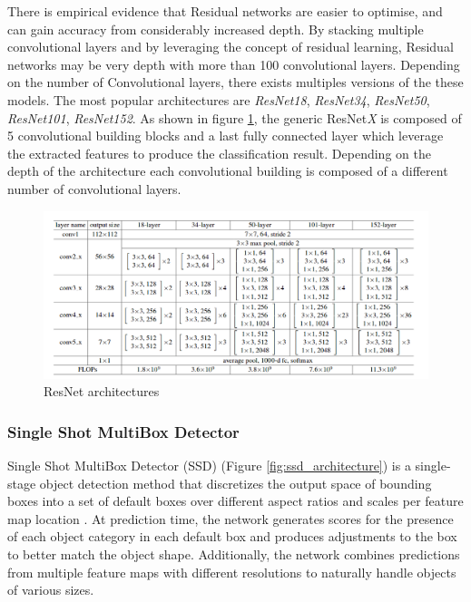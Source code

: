There is empirical evidence that Residual networks are easier to optimise, and can gain accuracy from considerably increased depth. By stacking multiple convolutional layers and by leveraging the concept of residual learning, Residual networks may be very depth with more than 100 convolutional layers. Depending on the number of Convolutional layers, there exists multiples versions of the these models. The most popular architectures are \textit{ResNet18}, \textit{ResNet34}, \textit{ResNet50}, \textit{ResNet101}, \textit{ResNet152}. As shown in figure \ref{fig:resnet_architectures}, the generic ResNet\textit{X} is composed of 5 convolutional building blocks and a last fully connected layer which leverage the extracted features to produce the classification result. Depending on the depth of the architecture each convolutional building is composed of a different number of convolutional layers.

\begin{figure}
\centerline{\includegraphics[scale=0.4]{images/chapter_2/resnet.png}}
\caption{ResNet architectures \citep{he2016deep}}
\label{fig:resnet_architectures}
\end{figure}


\subsubsection{Single Shot MultiBox Detector} \label{Single Shot MultiBox Detector}

Single Shot MultiBox Detector (SSD) (Figure \ref{fig:ssd_architecture}) is a single-stage object detection method that discretizes the output space of bounding boxes into a set of default boxes over different aspect ratios and scales per feature map location \citep{liu2016ssd}. At prediction time, the network generates scores for the presence of each object category in each default box and produces adjustments to the box to better match the object shape. Additionally, the network combines predictions from multiple feature maps with different resolutions to naturally handle objects of various sizes.

